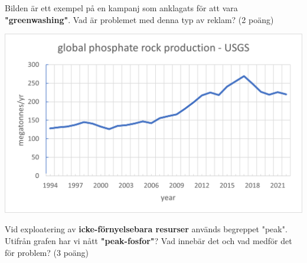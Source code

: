 \documentclass{exam}
\begin{document}
\begin{questions}
\question Bilden är ett exempel på en kampanj som anklagats för att vara \textbf{"greenwashing"}. Vad är problemet med denna typ av reklam? (2 poäng)

\break

\begin{center}
    \includegraphics[width=400pt]{image.png}
\end{center}

\question Vid exploatering av \textbf{icke-förnyelsebara resurser} används begreppet "peak". Utifrån grafen har vi nått \textbf{"peak-fosfor"}? Vad innebär det och vad medför det för problem? (3 poäng)


\end{questions}
\end{document}
